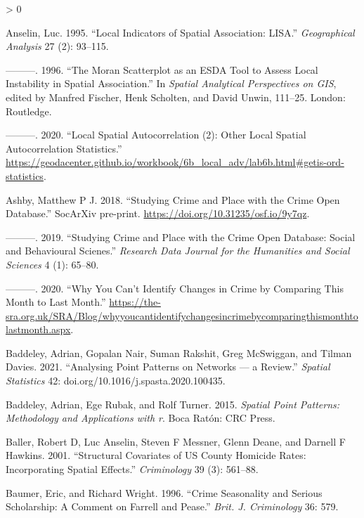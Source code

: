 \documentclass[
  krantz2]{krantz}
\newlength{\cslhangindent}
\newenvironment{CSLReferences}[2] %
 {%
  \setlength{\parindent}{0pt}
  \ifodd #1 \everypar{\setlength{\hangindent}{\cslhangindent}}\ignorespaces\fi
  \ifnum #2 > 0
  \setlength{\parskip}{#2\baselineskip}
  \fi
 }%
 {}
\begin{document}
\begin{CSLReferences}{1}{0}
\leavevmode\hypertarget{ref-Anselin_1995}{}%
Anselin, Luc. 1995. {``Local Indicators of Spatial Association: LISA.''} \emph{Geographical Analysis} 27 (2): 93--115.

\leavevmode\hypertarget{ref-Anselin_1996}{}%
---------. 1996. {``The Moran Scatterplot as an ESDA Tool to Assess Local Instability in Spatial Association.''} In \emph{Spatial Analytical Perspectives on GIS}, edited by Manfred Fischer, Henk Scholten, and David Unwin, 111--25. London: Routledge.

\leavevmode\hypertarget{ref-Anselin_2020a}{}%
---------. 2020. {``Local Spatial Autocorrelation (2): Other Local Spatial Autocorrelation Statistics.''} \url{https://geodacenter.github.io/workbook/6b_local_adv/lab6b.html\#getis-ord-statistics}.

\leavevmode\hypertarget{ref-Ashby_2018}{}%
Ashby, Matthew P J. 2018. {``Studying Crime and Place with the Crime Open Database.''} SocArXiv pre-print. \url{https://doi.org/10.31235/osf.io/9y7qz}.

\leavevmode\hypertarget{ref-Ashby_2019}{}%
---------. 2019. {``Studying Crime and Place with the Crime Open Database: Social and Behavioural Scienes.''} \emph{Research Data Journal for the Humanities and Social Sciences} 4 (1): 65--80.

\leavevmode\hypertarget{ref-Ashby_2020}{}%
---------. 2020. {``Why You Can't Identify Changes in Crime by Comparing This Month to Last Month.''} \url{https://the-sra.org.uk/SRA/Blog/whyyoucantidentifychangesincrimebycomparingthismonthtolastmonth.aspx}.

\leavevmode\hypertarget{ref-Baddeley_2021}{}%
Baddeley, Adrian, Gopalan Nair, Suman Rakshit, Greg McSwiggan, and Tilman Davies. 2021. {``Analysing Point Patterns on Networks --- a Review.''} \emph{Spatial Statistics} 42: doi.org/10.1016/j.spasta.2020.100435.

\leavevmode\hypertarget{ref-Baddeley_2016}{}%
Baddeley, Adrian, Ege Rubak, and Rolf Turner. 2015. \emph{Spatial Point Patterns: Methodology and Applications with r}. Boca Ratón: CRC Press.

\leavevmode\hypertarget{ref-Baller_2001}{}%
Baller, Robert D, Luc Anselin, Steven F Messner, Glenn Deane, and Darnell F Hawkins. 2001. {``Structural Covariates of US County Homicide Rates: Incorporating Spatial Effects.''} \emph{Criminology} 39 (3): 561--88.

\leavevmode\hypertarget{ref-Baumer_1996}{}%
Baumer, Eric, and Richard Wright. 1996. {``Crime Seasonality and Serious Scholarship: A Comment on Farrell and Pease.''} \emph{Brit. J. Criminology} 36: 579.


\end{CSLReferences}
\end{document}

